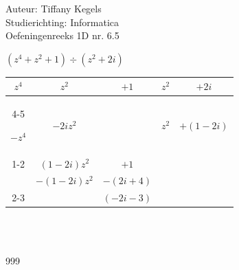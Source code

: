 \documentclass[a4paper]{article}
\begin{document}
  
\noindent \large Auteur: Tiffany Kegels \\
\noindent \large Studierichting: Informatica\\
\noindent \large Oefeningenreeks 1D nr. 6.5\\

\medskip

\normalsize

$(z^4 + z^2 +1) \div (z^2 +2i)$\\

\begin{tabular}{ccc|cc}
 $z^4$ & $z^2$        & $+1$        & $z^2$  & $+2i$\\ \cline{4-5}
 
$-z^4$ & $-2iz^2$     &             & $z^2$  & $+(1-2i)$\\ \cline{1-2}

       & $(1-2i)z^2$  & $+1$        &\\ 

       & $-(1-2i)z^2$ & $-(2i + 4)$ &\\ \cline{2-3}
       
       &              & $(-2i-3)$\\

\end{tabular}\\\\


\begin{thebibliography}{999}

\end{thebibliography}
\end{document}
